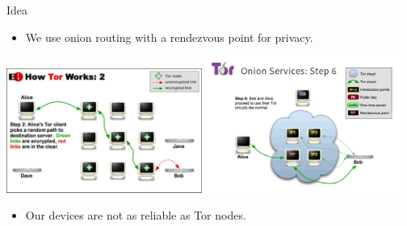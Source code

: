 \begin{frame}
  \begin{block}{Idea}
    \begin{itemize}
      \item We use onion routing with a rendezvous point for privacy.
    \end{itemize}
  \end{block}

  \includegraphics[width=0.48\textwidth]{fig/tor.png}
  \hfill
  \includegraphics[width=0.48\textwidth]{fig/tor-hs.png}

  \pause

  \begin{remark}
    \begin{itemize}
      \item Our devices are not as reliable as Tor nodes.
    \end{itemize}
  \end{remark}
\end{frame}

